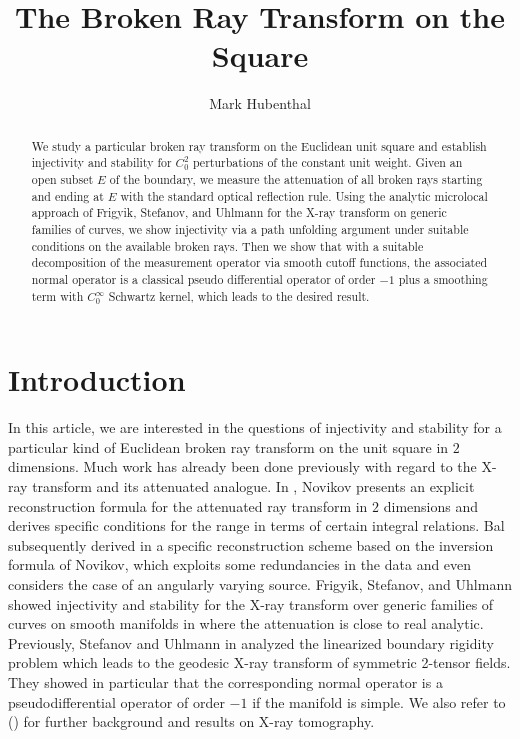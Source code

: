 \documentclass[10pt]{amsart}
\title{The Broken Ray Transform on the Square}
\date{}
\author[M. Hubenthal]{Mark Hubenthal}
\theoremstyle{definition}
\theoremstyle{definition}
\theoremstyle{definition}
\begin{document}
\maketitle
\begin{abstract}We study a particular broken ray transform on the Euclidean unit square and establish injectivity and stability for $C_{0}^{2}$ perturbations of the constant unit weight. Given an open subset $E$ of the boundary, we measure the attenuation of all broken rays starting and ending at $E$ with the standard optical reflection rule. Using the analytic microlocal approach of Frigyik, Stefanov, and Uhlmann for the X-ray transform on generic families of curves, we show injectivity via a path unfolding argument under suitable conditions on the available broken rays. Then we show that with a suitable decomposition of the measurement operator via smooth cutoff functions, the associated normal operator is a classical pseudo differential operator of order $-1$ plus a smoothing term with $C_{0}^{\infty}$ Schwartz kernel, which leads to the desired result.\end{abstract}

\section{Introduction \label{sec:intro}}
In this article, we are interested in the questions of injectivity and stability for a particular kind of Euclidean broken ray transform on the unit square in $2$ dimensions. Much work has already been done previously with regard to the X-ray transform and its attenuated analogue. In \cite{novikov, novikov2}, Novikov presents an explicit reconstruction formula for the attenuated ray transform in $2$ dimensions and derives specific conditions for the range in terms of certain integral relations. Bal subsequently derived in \cite{balradon} a specific reconstruction scheme based on the inversion formula of Novikov, which exploits some redundancies in the data and even considers the case of an angularly varying source. Frigyik, Stefanov, and Uhlmann showed injectivity and stability for the X-ray transform over generic families of curves on smooth manifolds in \cite{xraygeneric} where the attenuation is close to real analytic. Previously, Stefanov and Uhlmann in \cite{xraytensor} analyzed the linearized boundary rigidity problem which leads to the geodesic X-ray transform of symmetric 2-tensor fields. They showed in particular that the corresponding normal operator is a pseudodifferential operator of order $-1$ if the manifold is simple.  We also refer to (\cite{boman, finch1, finch2, natterer}) for further background and results on X-ray tomography. 
\end{document}
